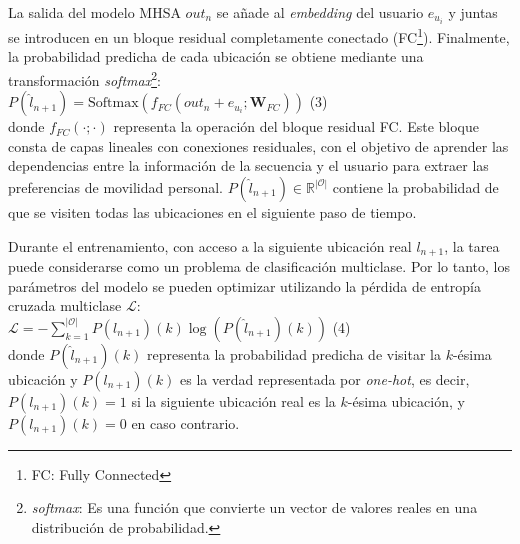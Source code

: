 La salida del modelo MHSA \(out_n\) se añade al \textit{embedding} del 
usuario \(e_{u_i}\) y juntas se introducen en un bloque residual 
completamente conectado (FC\footnote{FC: Fully Connected}). Finalmente, 
la probabilidad 
predicha de cada ubicación se obtiene mediante una transformación 
\textit{softmax}\footnote{\textit{softmax}: Es una función que convierte un vector de valores reales en una distribución de probabilidad.}:\\

\(P(\hat{l}_{n+1}) = \text{Softmax}(f_{FC}(out_n + e_{u_i}; \mathbf{W}_{FC}))\) (3)\\

donde \(f_{FC}(\cdot; \cdot)\) representa la operación del 
bloque residual FC. Este bloque consta de capas lineales con 
conexiones residuales, con el objetivo de aprender las dependencias 
entre la información de la secuencia y el usuario para extraer 
las preferencias de movilidad personal. 
\(P(\hat{l}_{n+1}) \in \mathbb{R}^{|\mathcal{O}|}\) contiene la 
probabilidad de que se visiten todas las ubicaciones en el 
siguiente paso de tiempo.

Durante el entrenamiento, con acceso a la siguiente ubicación 
real \(l_{n+1}\), la tarea puede considerarse como un problema de 
clasificación multiclase. Por lo tanto, los parámetros del modelo 
se pueden optimizar utilizando la pérdida de entropía cruzada 
multiclase \(\mathcal{L}\):\\

\(\mathcal{L} = -\sum_{k=1}^{|\mathcal{O}|} P(l_{n+1})(k) \log(P(\hat{l}_{n+1})(k))\) (4)\\

donde \(P(\hat{l}_{n+1})(k)\) representa la probabilidad predicha 
de visitar la \(k\)-ésima ubicación y \(P(l_{n+1})(k)\) es la verdad 
representada por \textit{one-hot}, es decir, 
\(P(l_{n+1})(k) = 1\) si la siguiente ubicación real es la 
\(k\)-ésima ubicación, y \(P(l_{n+1})(k) = 0\) en caso contrario.